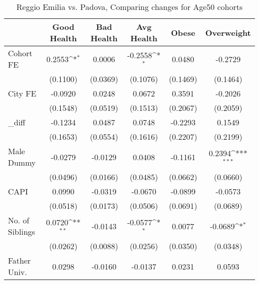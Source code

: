 \begin{table}[htbp]\centering
\def\sym#1{\ifmmode^{#1}\else\(^{#1}\)\fi}
\caption{Reggio Emilia vs. Padova, Comparing changes for Age50 cohorts}
\begin{tabular}{l*{5}{c}}
\toprule
            &\multicolumn{1}{c}{Good Health}&\multicolumn{1}{c}{Bad Health}&\multicolumn{1}{c}{Avg Health}&\multicolumn{1}{c}{Obese}&\multicolumn{1}{c}{Overweight}\\
\midrule
Cohort FE   &      0.2553\sym{*}  &      0.0006         &     -0.2558\sym{*}  &      0.0480         &     -0.2729         \\
            &    (0.1100)         &    (0.0369)         &    (0.1076)         &    (0.1469)         &    (0.1464)         \\
\addlinespace
City FE     &     -0.0920         &      0.0248         &      0.0672         &      0.3591         &     -0.2026         \\
            &    (0.1548)         &    (0.0519)         &    (0.1513)         &    (0.2067)         &    (0.2059)         \\
\addlinespace
\_diff       &     -0.1234         &      0.0487         &      0.0748         &     -0.2293         &      0.1549         \\
            &    (0.1653)         &    (0.0554)         &    (0.1616)         &    (0.2207)         &    (0.2199)         \\
\addlinespace
Male Dummy  &     -0.0279         &     -0.0129         &      0.0408         &     -0.1161         &      0.2394\sym{***}\\
            &    (0.0496)         &    (0.0166)         &    (0.0485)         &    (0.0662)         &    (0.0660)         \\
\addlinespace
CAPI        &      0.0990         &     -0.0319         &     -0.0670         &     -0.0899         &     -0.0573         \\
            &    (0.0518)         &    (0.0173)         &    (0.0506)         &    (0.0691)         &    (0.0689)         \\
\addlinespace
No. of Siblings&      0.0720\sym{**} &     -0.0143         &     -0.0577\sym{*}  &      0.0077         &     -0.0689\sym{*}  \\
            &    (0.0262)         &    (0.0088)         &    (0.0256)         &    (0.0350)         &    (0.0348)         \\
\addlinespace
Father Univ.&      0.0298         &     -0.0160         &     -0.0137         &      0.0231         &      0.0593         \\

\end{tabular}
\end{table}
